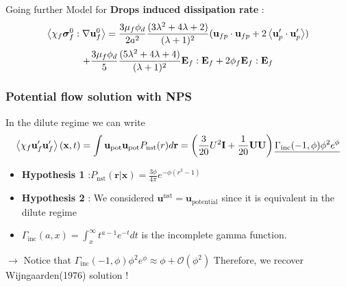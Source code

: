 \documentclass{sintefbeamer}
\begin{document}




\backmatter
\begin{frame}
  {Going further}
   Model for \textbf{Drops induced dissipation rate} : 
   \begin{multline*}
    \left<\chi_f \bm\sigma_f^0 :\mathbf{\nabla}\textbf{u}_f^0\right>
    =
    \frac{3\mu_f \phi_d}{2a^2}
    \frac{(3\lambda^2 + 4\lambda +2)}{(\lambda + 1)^2}
    (\textbf{u}_{fp}\cdot \textbf{u}_{fp} + 2 \left<\textbf{u}_p'\cdot\textbf{u}_p'\right>) \\
    + 
    \frac{3\mu_f \phi_d}{5}
    \frac{(5\lambda^2 + 4\lambda +4)}{(\lambda + 1)^2}
    \textbf{E}_f:\textbf{E}_f
    +2 \phi_f \textbf{E}_f:\textbf{E}_f
\end{multline*}
\end{frame}

\begin{frame}
  \frametitle{Potential flow solution with NPS}
  In the dilute regime we can write 
  \begin{multline*}
    \left<\chi_f \textbf{u}'_f\textbf{u}'_f\right>(\textbf{x},t)
    = 
    {\int \textbf{u}_\text{pot} \textbf{u}_\text{pot}  
    P_\text{nst}(r) d\textbf{r} }
    =  \left(\frac{3}{20} U^2\textbf{I} + \frac{1}{20}\textbf{UU} \right)
    \underline{\Gamma_\text{inc}(-1,\phi)\phi^2 e^\phi}
  \end{multline*}

  \begin{itemize}
    \item  \textbf{Hypothesis 1} :$P_\text{nst}(\textbf{r}|\textbf{x}) = \frac{3\phi}{4\pi}
    e^{ - \phi (r^3 - 1) }$
    \item \textbf{Hypothesis 2} : We considered $\textbf{u}^\text{nst} = \textbf{u}_\text{potential}$ since it is equivalent in the dilute regime
    \item $\Gamma_\text{inc}(a,x) = \int_x^\infty t^{a-1} e^{-t} dt $ is the incomplete gamma  function. 
  \end{itemize}

  $\to$ Notice that $\Gamma_\text{inc}(-1,\phi)\phi^2 e^\phi \approx  \phi + \mathcal{O}(\phi^2)$ Therefore, we recover  Wijngaarden(1976) solution ! 

\end{frame}
\end{document}
